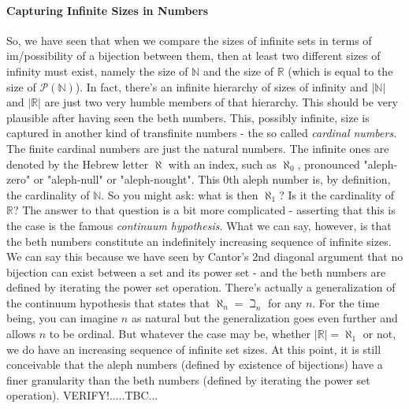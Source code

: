 


\paragraph{Capturing Infinite Sizes in Numbers} So, we have seen that when we compare the sizes of infinite sets in terms of im/possibility of a bijection between them, then at least two different sizes of infinity must exist, namely the size of $\mathbb{N}$ and the size of $\mathbb{R}$ (which is equal to the size of $\mathcal{P}(\mathbb{N})$). In fact, there's an infinite hierarchy of sizes of infinity and $|\mathbb{N}|$ and $|\mathbb{R}|$ are just two very humble members of that hierarchy. This should be very plausible after having seen the beth numbers. This, possibly infinite, size is captured in another kind of transfinite numbers - the so called \emph{cardinal numbers}. The finite cardinal numbers are just the natural numbers. The infinite ones are denoted by the Hebrew letter $\aleph$ with an index, such as $\aleph_0$, pronounced "aleph-zero" or "aleph-null" or "aleph-nought". This $0$th aleph number is, by definition, the cardinality of $\mathbb{N}$. So you might ask: what is then $\aleph_1$? Is it the cardinality of $\mathbb{R}$? The answer to that question is a bit more complicated - asserting that this is the case is the famous \emph{continuum hypothesis}. What we can say, however, is that the beth numbers constitute an indefinitely increasing sequence of infinite sizes. We can say this because we have seen by Cantor's 2nd diagonal argument that no bijection can exist between a set and its power set - and the beth numbers are defined by iterating the power set operation. There's actually a generalization of the continuum hypothesis that states that $\aleph_n = \beth_n$ for any $n$. For the time being, you can imagine $n$ as natural but the generalization goes even further and allows $n$ to be ordinal. But whatever the case may be, whether $|\mathbb{R}| = \aleph_1$ or not, we do have an increasing sequence of infinite set sizes. At this point, it is still conceivable that the aleph numbers (defined by existence of bijections) have a finer granularity than the beth numbers (defined by iterating the power set operation). VERIFY!.....TBC...


